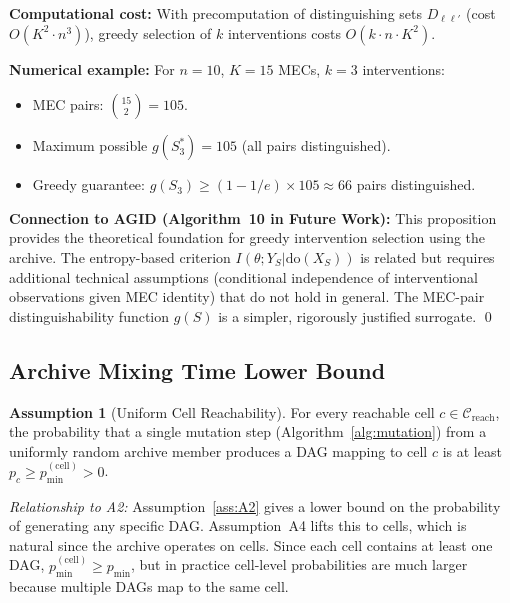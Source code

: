 \documentclass{article}
\theoremstyle{definition}
\newtheorem{assumption}{Assumption}
\theoremstyle{plain}
\theoremstyle{remark}
\begin{document}
\textbf{Computational cost:} With precomputation of distinguishing sets $D_{\ell\ell'}$
(cost $O(K^2 \cdot n^3)$), greedy selection of $k$ interventions costs
$O(k \cdot n \cdot K^2)$.

\textbf{Numerical example:} For $n = 10$, $K = 15$ MECs, $k = 3$ interventions:
\begin{itemize}
  \item MEC pairs: $\binom{15}{2} = 105$.
  \item Maximum possible $g(S^*_3) = 105$ (all pairs distinguished).
  \item Greedy guarantee: $g(S_3) \geq (1 - 1/e) \times 105 \approx 66$ pairs distinguished.
\end{itemize}

\textbf{Connection to AGID (Algorithm~10 in Future Work):} This proposition provides
the theoretical foundation for greedy intervention selection using the archive. The
entropy-based criterion $I(\theta; Y_S | \mathrm{do}(X_S))$ is related but requires
additional technical assumptions (conditional independence of interventional observations
given MEC identity) that do not hold in general. The MEC-pair distinguishability
function $g(S)$ is a simpler, rigorously justified surrogate. \qed


\subsection{Archive Mixing Time Lower Bound}
\label{subsec:mixing_time}

\begin{assumption}[Uniform Cell Reachability]
\label{ass:A4}
For every reachable cell $c \in \mathcal{C}_{\mathrm{reach}}$, the probability that a
single mutation step (Algorithm~\ref{alg:mutation}) from a uniformly random archive member
produces a DAG mapping to cell $c$ is at least $p_c \geq p_{\min}^{(\mathrm{cell})} > 0$.

\emph{Relationship to A2:} Assumption~\ref{ass:A2} gives a lower bound on the probability
of generating any specific DAG. Assumption~A4 lifts this to cells, which is natural since
the archive operates on cells. Since each cell contains at least one DAG,
$p_{\min}^{(\mathrm{cell})} \geq p_{\min}$, but in practice cell-level probabilities are
much larger because multiple DAGs map to the same cell.
\end{assumption}
\end{document}
